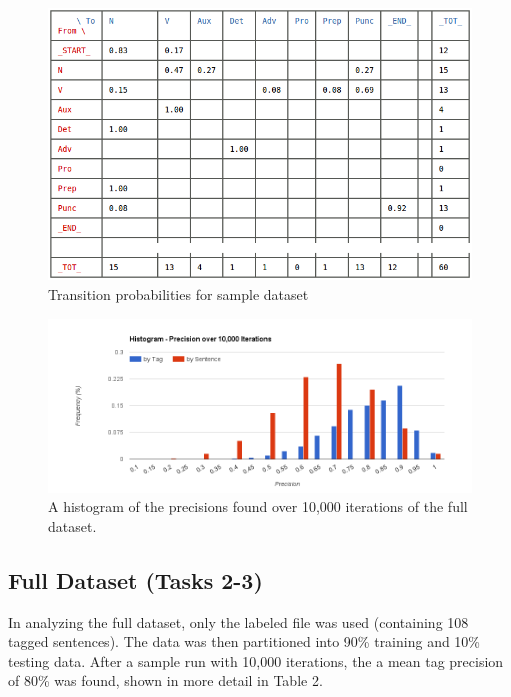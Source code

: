 \documentclass[11pt]{article}
\begin{document}
\begin{figure}
    \centering
    \includegraphics[width=150mm]{img/sample_transitions.png}
    \caption{Transition probabilities for sample dataset}
    \label{fig:sampleHmm_trans}
\end{figure}

\clearpage
%


\begin{figure}
    \centering
    \includegraphics[width=\textwidth]{img/histogram_pcnt.png}
    \caption{A histogram of the precisions found over 10,000 iterations of the full dataset.}
    \label{fig:hist_freqs}
\end{figure}



\subsection{Full Dataset (Tasks 2-3)}
In analyzing the full dataset, only the labeled file was used (containing 108 tagged sentences).
The data was then partitioned into 90\% training and 10\% testing data.  After a sample run
with 10,000 iterations, the a mean tag precision of 80\% was found, shown in more detail in Table 2.
\end{document}
